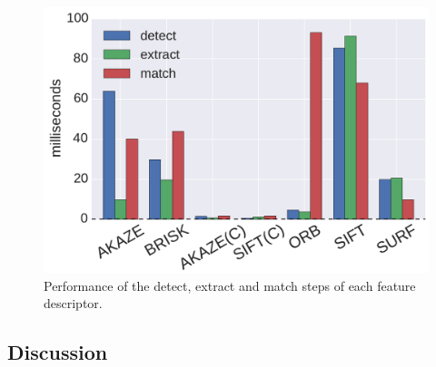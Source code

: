 \begin{figure}[!htb]
	\includegraphics[width=0.95\linewidth]{imgs/performances.pdf}
\vspace{-2.5mm}	
\caption{Performance of the detect, extract and match steps of each feature descriptor.}
\vspace{-2mm}
\label{fig:speed_b}
\end{figure}


\subsection{Discussion}

